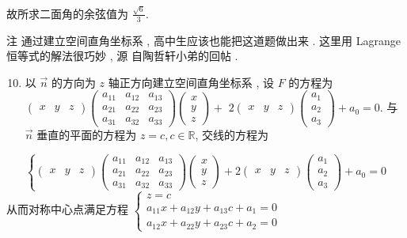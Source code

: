 \documentclass[10pt]{article}
\begin{document}

 故所求二面角的余弦值为  $\frac{\sqrt{6}}{3}$.

 注   通过建立空间直角坐标系 ,  高中生应该也能把这道题做出来 .  这里用  Lagrange  恒等式的解法很巧妙 ,  源   自陶哲轩小弟的回帖 .

\begin{enumerate}
  \setcounter{enumi}{9}
  \item  以  $\vec{n}$  的方向为  $z$  轴正方向建立空间直角坐标系 ,  设  $F$  的方程为  $\left(\begin{array}{lll}x & y & z\end{array}\right)\left(\begin{array}{lll}a_{11} & a_{12} & a_{13} \\ a_{21} & a_{22} & a_{23} \\ a_{31} & a_{32} & a_{33}\end{array}\right)\left(\begin{array}{l}x \\ y \\ z\end{array}\right)+$ $2\left(\begin{array}{lll}x & y & z\end{array}\right)\left(\begin{array}{l}a_{1} \\ a_{2} \\ a_{3}\end{array}\right)+a_{0}=0$.  与  $\vec{n}$  垂直的平面的方程为  $z=c, c \in \mathbb{R}$,  交线的方程为 
\end{enumerate}
$$
\left\{\left(\begin{array}{lll}
x & y & z
\end{array}\right)\left(\begin{array}{lll}
a_{11} & a_{12} & a_{13} \\
a_{21} & a_{22} & a_{23} \\
a_{31} & a_{32} & a_{33}
\end{array}\right)\left(\begin{array}{l}
x \\
y \\
z
\end{array}\right)+2\left(\begin{array}{lll}
x & y & z
\end{array}\right)\left(\begin{array}{l}
a_{1} \\
a_{2} \\
a_{3}
\end{array}\right)+a_{0}=0\right.
$$
 从而对称中心点满足方程  $\left\{\begin{array}{r}z=c \\ a_{11} x+a_{12} y+a_{13} c+a_{1}=0 \\ a_{12} x+a_{22} y+a_{23} c+a_{2}=0\end{array}\right.$
\end{document}
